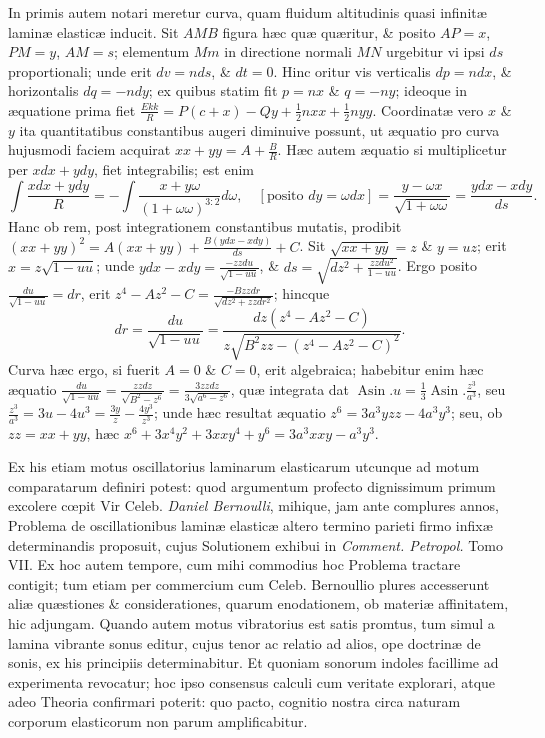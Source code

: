 In primis autem notari meretur curva, quam fluidum altitudinis quasi infinitæ laminæ elasticæ inducit. Sit $AMB$ figura hæc quæ quæritur, \& posito $AP=x$, $PM=y$, $AM=s$; elementum $Mm$ in directione normali $MN$ urgebitur vi ipsi $ds$ proportionali; unde erit $dv=nds$, \& $dt=0$. Hinc oritur vis verticalis $dp=ndx$, \& horizontalis $dq=-ndy$; ex quibus statim fit $p=nx$ \& $q=-ny$; ideoque in æquatione prima fiet $\frac{Ekk}R=P(c+x)-Qy+\frac12nxx+\frac12nyy$.
Coordinatæ vero $x$ \& $y$ ita quantitatibus constantibus augeri diminuive possunt, ut æquatio pro curva hujusmodi faciem acquirat $xx+yy=A+\frac BR$. Hæc autem æquatio si multiplicetur per $xdx+ydy$, fiet integrabilis; est enim
\[\int\frac{xdx+ydy}R=-\int\frac{x+y\omega}{(1+\omega\omega)^{3:2}}d\omega,\quad[\text{posito }dy=\omega dx]=\frac{y-\omega x}{\sqrt{1+\omega\omega}}=\frac{ydx-xdy}{ds}.\]
Hanc ob rem, post integrationem constantibus mutatis, prodibit $(xx+yy)^2=A(xx+yy)+\frac{B(ydx-xdy)}{ds}+C$. Sit $\sqrt{xx+yy}=z$ \& $y=uz$; erit $x=z\sqrt{1-uu}$; unde $ydx-xdy=\frac{-zzdu}{\sqrt{1-uu}}$, \& $ds=\sqrt{dz^2+\frac{zzdu^2}{1-uu}}$. Ergo posito $\frac{du}{\sqrt{1-uu}}=dr$, erit $z^4-Az^2-C=\frac{-Bzzdr}{\sqrt{dz^2+zzdr^2}}$; hincque
\[dr=\frac{du}{\sqrt{1-uu}}=\frac{dz(z^4-Az^2-C)}{z\sqrt{B^2zz-(z^4-Az^2-C)^2}}.\]
Curva hæc ergo, si fuerit $A=0$ \& $C=0$, erit algebraica; habebitur enim hæc æquatio $\frac{du}{\sqrt{1-uu}}=\frac{zzdz}{\sqrt{B^2-z^6}}=\frac{3zzdz}{3\sqrt{a^6-z^6}}$, quæ integrata dat $\operatorname{Asin}.u=\frac13\operatorname{Asin}.\frac{z^3}{a^3}$, seu $\frac{z^3}{a^3}=3u-4u^3=\frac{3y}z-\frac{4y^3}{z^3}$; unde hæc resultat æquatio $z^6=3a^3yzz-4a^3y^3$; seu, ob $zz=xx+yy$, hæc $x^6+3x^4y^2+3xxy^4+y^6=3a^3xxy-a^3y^3$.

Ex his etiam motus oscillatorius laminarum elasticarum utcunque ad motum comparatarum definiri potest: quod argumentum profecto dignissimum primum excolere cœpit Vir Celeb. \textit{Daniel Bernoulli}, mihique, jam ante complures annos, Problema de oscillationibus laminæ elasticæ altero termino parieti firmo infixæ determinandis proposuit, cujus Solutionem
exhibui in \textit{Comment. Petropol.} Tomo VII. Ex hoc autem tempore, cum mihi commodius hoc Problema tractare contigit; tum etiam per commercium cum Celeb. Bernoullio plures accesserunt aliæ quæstiones \& considerationes, quarum enodationem, ob materiæ affinitatem, hic adjungam. Quando autem motus vibratorius est satis promtus, tum simul a lamina vibrante sonus editur, cujus tenor ac relatio ad alios, ope doctrinæ de sonis, ex his principiis determinabitur. Et quoniam sonorum indoles facillime ad experimenta revocatur; hoc ipso consensus calculi cum veritate explorari, atque adeo Theoria confirmari poterit: quo pacto, cognitio nostra circa naturam corporum elasticorum non parum amplificabitur.

